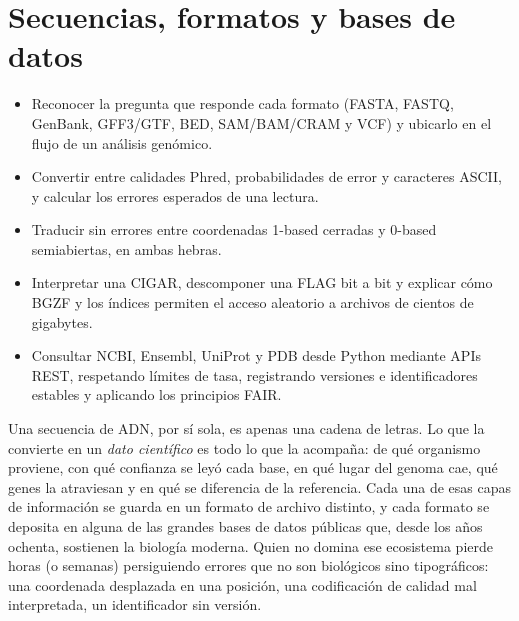 \chapter{Secuencias, formatos y bases de datos}\label{cap:02}


\begin{objetivos}
\begin{itemize}
  \item Reconocer la pregunta que responde cada formato (FASTA, FASTQ, GenBank, GFF3/GTF, BED, SAM/BAM/CRAM y VCF) y ubicarlo en el flujo de un análisis genómico.
  \item Convertir entre calidades Phred, probabilidades de error y caracteres ASCII, y calcular los errores esperados de una lectura.
  \item Traducir sin errores entre coordenadas 1-based cerradas y 0-based semiabiertas, en ambas hebras.
  \item Interpretar una CIGAR, descomponer una FLAG bit a bit y explicar cómo BGZF y los índices permiten el acceso aleatorio a archivos de cientos de gigabytes.
  \item Consultar NCBI, Ensembl, UniProt y PDB desde Python mediante APIs REST, respetando límites de tasa, registrando versiones e identificadores estables y aplicando los principios FAIR.
\end{itemize}
\end{objetivos}

Una secuencia de ADN, por sí sola, es apenas una cadena de letras. Lo que la convierte en un \emph{dato científico} es todo lo que la acompaña: de qué organismo proviene, con qué confianza se leyó cada base, en qué lugar del genoma cae, qué genes la atraviesan y en qué se diferencia de la referencia. Cada una de esas capas de información se guarda en un formato de archivo distinto, y cada formato se deposita en alguna de las grandes bases de datos públicas que, desde los años ochenta, sostienen la biología moderna. Quien no domina ese ecosistema pierde horas (o semanas) persiguiendo errores que no son biológicos sino tipográficos: una coordenada desplazada en una posición, una codificación de calidad mal interpretada, un identificador sin versión.

